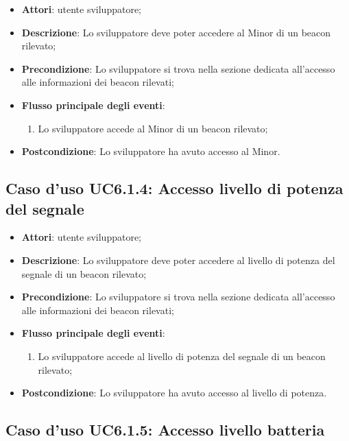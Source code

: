 \documentclass[../AnalisiDeiRequisiti.tex]{subfiles}
\begin{document}
\begin{itemize}
\item \textbf{Attori}: utente sviluppatore;
\item \textbf{Descrizione}: Lo sviluppatore deve poter accedere al Minor di un beacon rilevato; 
      \item \textbf{Precondizione}: Lo sviluppatore si trova nella sezione dedicata all'accesso alle informazioni dei beacon rilevati;

        \item \textbf{Flusso principale degli eventi}:
          \begin{enumerate}
          \item Lo sviluppatore accede al Minor di un beacon rilevato;

      \end{enumerate}
    \item \textbf{Postcondizione}: Lo sviluppatore ha avuto accesso al Minor.
  \end{itemize}
\hypertarget{UC6.1.4}{}
\subsection{Caso d'uso UC6.1.4: Accesso livello di potenza del segnale}
\begin{itemize}
\item \textbf{Attori}: utente sviluppatore;
\item \textbf{Descrizione}: Lo sviluppatore deve poter accedere al livello di potenza del segnale di un beacon rilevato; 
      \item \textbf{Precondizione}: Lo sviluppatore si trova nella sezione dedicata all'accesso alle informazioni dei beacon rilevati;

        \item \textbf{Flusso principale degli eventi}:
          \begin{enumerate}
          \item Lo sviluppatore accede al livello di potenza del segnale di un beacon rilevato;

      \end{enumerate}
    \item \textbf{Postcondizione}: Lo sviluppatore ha avuto accesso al livello di potenza.
  \end{itemize}
\hypertarget{UC6.1.5}{}
\subsection{Caso d'uso UC6.1.5: Accesso livello batteria}
\end{document}

